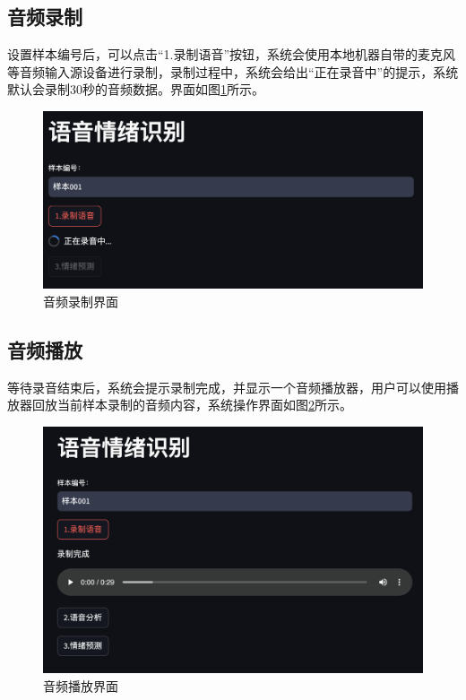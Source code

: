 \documentclass[lang=cn,newtx,12pt,scheme=chinese]{elegantbook}
\begin{document}
\subsection{音频录制}

设置样本编号后，可以点击“1.录制语音”按钮，系统会使用本地机器自带的麦克风等音频输入源设备进行录制，录制过程中，系统会给出“正在录音中”的提示，系统默认会录制30秒的音频数据。界面如图\ref{fig2}所示。

\begin{figure}
	\label{fig2}
	\includegraphics[width=\textwidth]{image/截图2.png}
	\caption{音频录制界面}
\end{figure}

\subsection{音频播放}

等待录音结束后，系统会提示录制完成，并显示一个音频播放器，用户可以使用播放器回放当前样本录制的音频内容，系统操作界面如图\ref{fig3}所示。

\begin{figure}
	\label{fig3}
	\includegraphics[width=\textwidth]{image/截图3.png}
	\caption{音频播放界面}
\end{figure}
\end{document}
